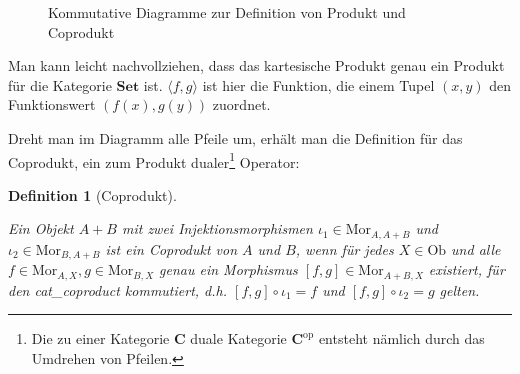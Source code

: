 \documentclass[a4paper, bibgerm]{article}
\newcommand\abb{}
\newtheorem{defini}{Definition}
\newcommand{\defi}[2]{%
  \begin{defini}[#1]
    \label{def:#1}
    #2
  \end{defini}
}
\begin{document}
\begin{figure}
  \centering
  \caption{Kommutative Diagramme zur Definition von Produkt und Coprodukt}
\end{figure}

Man kann leicht nachvollziehen, dass das kartesische Produkt genau ein
Produkt für die Kategorie $\mathbf{Set}$ ist. $\langle f,g \rangle$ ist
hier die Funktion, die einem Tupel $(x,y)$ den Funktionswert $(f(x),
g(y))$ zuordnet.

Dreht man im Diagramm alle Pfeile um, erhält man die Definition für das
Coprodukt, ein zum Produkt dualer\footnote{Die zu einer Kategorie
  $\mathbf{C}$ duale Kategorie $\mathbf{C}^{\mathrm{op}}$ entsteht
  nämlich durch das Umdrehen von Pfeilen.} Operator:

\defi{Coprodukt}{
  Ein Objekt $A + B$ mit zwei Injektionsmorphismen $\iota_1
  \in \mathrm{Mor}_{A,A + B}$ und $\iota_2 \in \mathrm{Mor}_{B,A +
    B}$ ist ein Coprodukt von $A$ und $B$, wenn für jedes $X \in
  \mathrm{Ob}$ und alle $f \in \mathrm{Mor}_{A,X},g \in
  \mathrm{Mor}_{B,X}$ genau ein Morphismus
  $[f,g] \in \mathrm{Mor}_{A + B,X}$ existiert, für den \abb{cat_coproduct} kommutiert, d.h. 
  $[f,g] \circ \iota_1 = f$ und $[f,g] \circ \iota_2 = g$ gelten.
}
\end{document}
